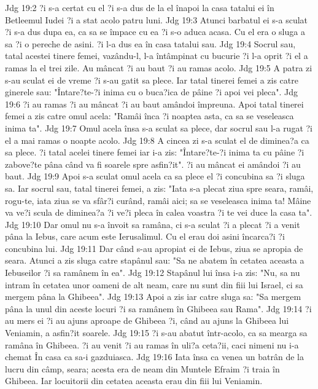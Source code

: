 Jdg 19:2  ?i s-a certat cu el ?i s-a dus de la el înapoi la casa tatalui ei în Betleemul Iudei ?i a stat acolo patru luni.
Jdg 19:3  Atunci barbatul ei s-a sculat ?i s-a dus dupa ea, ca sa se împace cu ea ?i s-o aduca acasa. Cu el era o sluga a sa ?i o pereche de asini. ?i l-a dus ea în casa tatalui sau.
Jdg 19:4  Socrul sau, tatal acestei tinere femei, vazându-l, l-a întâmpinat cu bucurie ?i l-a oprit ?i el a ramas la el trei zile. Au mâncat ?i au baut ?i au ramas acolo.
Jdg 19:5  A patra zi s-au sculat ei de vreme ?i s-au gatit sa plece. Iar tatal tinerei femei a zis catre ginerele sau: "Întare?te-?i inima cu o buca?ica de pâine ?i apoi vei pleca".
Jdg 19:6  ?i au ramas ?i au mâncat ?i au baut amândoi împreuna. Apoi tatal tinerei femei a zis catre omul acela: "Ramâi înca ?i noaptea asta, ca sa se veseleasca inima ta".
Jdg 19:7  Omul acela însa s-a sculat sa plece, dar socrul sau l-a rugat ?i el a mai ramas o noapte acolo.
Jdg 19:8  A cincea zi s-a sculat el de diminea?a ca sa plece. ?i tatal acelei tinere femei iar i-a zis: "Întare?te-?i inima ta cu pâine ?i zabove?te pâna când va fi soarele spre asfin?it". ?i au mâncat ei amândoi ?i au baut.
Jdg 19:9  Apoi s-a sculat omul acela ca sa plece el ?i concubina sa ?i sluga sa. Iar socrul sau, tatal tinerei femei, a zis: "Iata s-a plecat ziua spre seara, ramâi, rogu-te, iata ziua se va sfâr?i curând, ramâi aici; sa se veseleasca inima ta! Mâine va ve?i scula de diminea?a ?i ve?i pleca în calea voastra ?i te vei duce la casa ta".
Jdg 19:10  Dar omul nu s-a învoit sa ramâna, ci s-a sculat ?i a plecat ?i a venit pâna la Iebus, care acum este Ierusalimul. Cu el erau doi asini încarca?i ?i concubina lui.
Jdg 19:11  Dar când s-au apropiat ei de Iebus, ziua se apropia de seara. Atunci a zis sluga catre stapânul sau: "Sa ne abatem în cetatea aceasta a Iebuseilor ?i sa ramânem în ea".
Jdg 19:12  Stapânul lui însa i-a zis: "Nu, sa nu intram în cetatea unor oameni de alt neam, care nu sunt din fiii lui Israel, ci sa mergem pâna la Ghibeea".
Jdg 19:13  Apoi a zis iar catre sluga sa: "Sa mergem pâna la unul din aceste locuri ?i sa ramânem în Ghibeea sau Rama".
Jdg 19:14  ?i au mers ei ?i au ajuns aproape de Ghibeea ?i, când au ajuns la Ghibeea lui Veniamin, a asfin?it soarele.
Jdg 19:15  ?i s-au abatut într-acolo, ca sa mearga sa ramâna în Ghibeea. ?i au venit ?i au ramas în uli?a ceta?ii, caci nimeni nu i-a chemat În casa ca sa-i gazduiasca.
Jdg 19:16  Iata însa ca venea un batrân de la lucru din câmp, seara; acesta era de neam din Muntele Efraim ?i traia în Ghibeea. Iar locuitorii din cetatea aceasta erau din fiii lui Veniamin.
